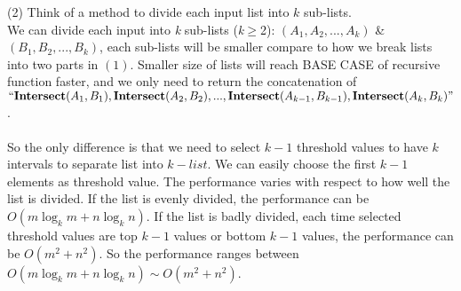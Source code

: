 \documentclass[12pt, letterpaper, twoside]{article}
\begin{document}
\begin{enumerate}
        (2) Think of a method to divide each input list into $k$ sub-lists.\\
        We can divide each input into \textit{k} sub-lists (\textit{k}$\geq$2): $(A_1, A_2, ... , A_k)$ \& $(B_1, B_2, ... , B_k)$, each sub-lists will be smaller compare to how we break lists into two parts in $(1)$. Smaller size of lists will reach BASE CASE of recursive function faster, and we only need to return the concatenation of $``\textbf{Intersect}(A_1,B_1),\textbf{Intersect}(A_2,B_2),..., \textbf{Intersect}(A_{k-1},B_{k-1}),\\ \textbf{Intersect}(A_k,B_k)"$.\\\\
        So the only difference is that we need to select $k-1$ threshold values to have $k$ intervals to separate list into $k-list$. We can easily choose the first $k-1$ elements as threshold value. The performance varies with respect to how well the list is divided. If the list is evenly divided, the performance can be $O(m\log_k m + n\log_k n)$. If the list is badly divided, each time selected threshold values are top $k-1$ values or bottom $k-1$ values, the performance can be $O(m^2 + n^2)$. So the performance ranges between $O(m\log_k m + n\log_k n) \sim O(m^2 + n^2)$.


\end{enumerate}
\end{document}
